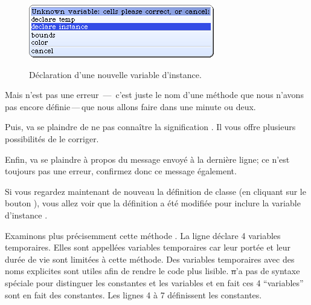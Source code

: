 \documentclass[a4paper,10pt,twoside]{book}
\begin{document}
\begin{figure}[htb]
\begin{minipage}{0.64\textwidth}
		{\includegraphics[scale=0.7]{DeclareInstanceVar}}
	\caption{Déclaration d'une nouvelle variable d'instance.\label{fig:declareInstance}}
\end{minipage}
\end{figure}

Mais  n'est pas une erreur \,---\, c'est juste le nom d'une méthode que nous n'avons pas encore définie\,---\,que nous allons faire dans une minute ou deux.


Puis, \squeak va se plaindre de ne pas connaître la signification . Il vous offre plusieurs possibilités de le corriger.

Enfin, \squeak va se plaindre à propos du message  envoyé à la dernière ligne; ce n'est toujours pas une erreur, confirmez donc ce message également.

Si vous regardez maintenant de nouveau la définition de classe (en cliquant sur le bouton ), vous allez voir que la définition a été modifiée pour inclure la variable d'instance .

Examinons plus précisemment cette méthode .
La ligne  déclare 4 variables temporaires. Elles sont appellées variables temporaires car leur portée et leur durée de vie sont limitées à cette méthode. Des variables temporaires avec des noms explicites sont utiles afin de rendre le code plus lisible. \st n'a pas de syntaxe spéciale pour distinguer les constantes et les variables et en fait ces 4 ``variables'' sont en fait des constantes. Les lignes 4 à 7 définissent les constantes.
\end{document}
